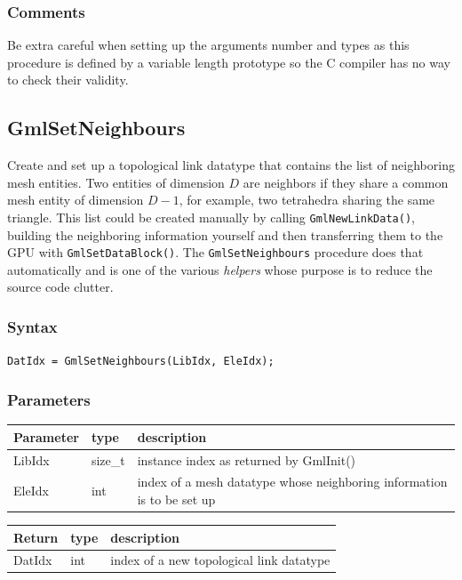 \documentclass[a4paper,12pt]{article}
\begin{document}
\subsubsection*{Comments}
Be extra careful when setting up the arguments number and types as this procedure is defined by a variable length prototype so the C compiler has no way to check their validity.


\subsection{GmlSetNeighbours}
Create and set up a topological link datatype that contains the list of neighboring mesh entities. Two entities of dimension $D$ are neighbors if they share a common mesh entity of dimension $D-1$, for example, two tetrahedra sharing the same triangle. This list could be created manually by calling  {\tt GmlNewLinkData()}, building the neighboring information yourself and then transferring them to the GPU with {\tt GmlSetDataBlock()}. The {\tt GmlSetNeighbours} procedure does that automatically and is one of the various \emph{helpers} whose purpose is to reduce the source code clutter.

\subsubsection*{Syntax}
{\tt DatIdx = GmlSetNeighbours(LibIdx, EleIdx);}

\subsubsection*{Parameters}
\begin{tabular}{|m{2cm}|m{1.5cm}|m{10.5cm}|}
\hline
Parameter  & type    & description \\
\hline
LibIdx     & size\_t & instance index as returned by GmlInit() \\
\hline
EleIdx     & int     & index of a mesh datatype whose neighboring information is to be set up \\
\hline
\end{tabular}

\medskip

\begin{tabular}{|m{2cm}|m{1.5cm}|m{10.5cm}|}
\hline
Return     & type   & description \\
\hline
DatIdx     & int    & index of a new topological link datatype \\
\hline
\end{tabular}
\end{document}
